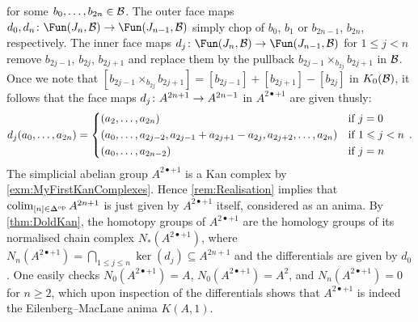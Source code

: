 \documentclass[a4paper, 10pt, oneside, DIV=9, chapterprefix=true, numbers=enddot,bibliography=totoc]{scrbook}
\begin{document}
\begin{proof*}
\begin{center}
\begin{tikzpicture}[x=0.707cm,y=0.707cm,line cap=round]
		\end{tikzpicture}
	\end{center}
	for some $b_0,\dotsc,b_{2n}\in\Bb$. The outer face maps $d_0,d_{n}\colon \Fun(J_n,\Bb)\morphism \Fun(J_{n-1},\Bb)$ simply chop of $b_0$, $b_1$ or $b_{2n-1}$, $b_{2n}$, respectively. The inner face maps $d_j\colon \Fun(J_n,\Bb)\morphism \Fun(J_{n-1},\Bb)$ for $1\leq j<n$ remove $b_{2j-1}$, $b_{2j}$, $b_{2j+1}$ and replace them by the pullback $b_{2j-1}\times_{b_{2j}}b_{2j+1}$ in $\Bb$. Once we note that $[b_{2j-1}\times_{b_{2j}}b_{2j+1}]=[b_{2j-1}]+[b_{2j+1}]-[b_{2j}]$ in $K_0(\Bb)$, it follows that the face maps $d_j\colon A^{2n+1}\morphism A^{2n-1}$ in $A^{2\bullet+1}$ are given thusly:
	\begin{equation*}
		d_j(a_0,\dotsc,a_{2n})=
		\begin{cases*}
			(a_2,\dotsc,a_{2n}) & if $j=0$\\
			(a_0,\dotsc,a_{2j-2},a_{2j-1}+a_{2j+1}-a_{2j},a_{2j+2},\dotsc,a_{2n}) & if $1\leq j<n$\\
			(a_0,\dotsc,a_{2n-2}) & if $j=n$
		\end{cases*}\,.
	\end{equation*}
	The simplicial abelian group $A^{2\bullet+1}$ is a Kan complex by \cref{exm:MyFirstKanComplexes}. Hence \cref{rem:Realisation} implies that $\colimit_{[n]\in\IDelta^\op}A^{2n+1}$ is just given by $A^{2\bullet+1}$ itself, considered as an anima. By \cref{thm:DoldKan}, the homotopy groups of $A^{2\bullet+1}$ are the homology groups of its normalised chain complex $N_*(A^{2\bullet+1})$, where $N_n(A^{2\bullet+1})=\bigcap_{1\leq j\leq n}\ker(d_j)\subseteq A^{2n+1}$ and the differentials are given by $d_0$. One easily checks $N_0(A^{2\bullet+1})=A$, $N_0(A^{2\bullet+1})=A^2$, and $N_n(A^{2\bullet+1})=0$ for $n\geq 2$, which upon inspection of the differentials shows that $A^{2\bullet+1}$ is indeed the Eilenberg--MacLane anima $K(A,1)$.
\end{proof*}
\end{document}
